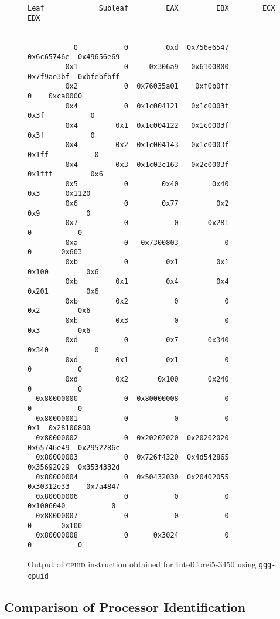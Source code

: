 \documentclass[a4paper,10pt,oneside,unicode]{article}
\newcommand{\cpuid}{\textsc{cpuid} }
\begin{document}
\begin{figure}[htbp]
\centering
\begin{verbatim}
Leaf             Subleaf         EAX         EBX        ECX          EDX
------------------------------------------------------------------------
           0           0         0xd  0x756e6547  0x6c65746e  0x49656e69
         0x1           0     0x306a9   0x6100800  0x7f9ae3bf  0xbfebfbff
         0x2           0  0x76035a01    0xf0b0ff           0    0xca0000
         0x4           0  0x1c004121   0x1c0003f        0x3f           0
         0x4         0x1  0x1c004122   0x1c0003f        0x3f           0
         0x4         0x2  0x1c004143   0x1c0003f       0x1ff           0
         0x4         0x3  0x1c03c163   0x2c0003f      0x1fff         0x6
         0x5           0        0x40        0x40         0x3      0x1120
         0x6           0        0x77         0x2         0x9           0
         0x7           0           0       0x281           0           0
         0xa           0   0x7300803           0           0       0x603
         0xb           0         0x1         0x1       0x100         0x6
         0xb         0x1         0x4         0x4       0x201         0x6
         0xb         0x2           0           0         0x2         0x6
         0xb         0x3           0           0         0x3         0x6
         0xd           0         0x7       0x340       0x340           0
         0xd         0x1         0x1           0           0           0
         0xd         0x2       0x100       0x240           0           0
  0x80000000           0  0x80000008           0           0           0
  0x80000001           0           0           0         0x1  0x28100800
  0x80000002           0  0x20202020  0x20202020  0x65746e49  0x2952286c
  0x80000003           0  0x726f4320  0x4d542865  0x35692029  0x3534332d
  0x80000004           0  0x50432030  0x20402055  0x30312e33    0x7a4847
  0x80000006           0           0           0   0x1006040           0
  0x80000007           0           0           0           0       0x100
  0x80000008           0      0x3024           0           0           0
\end{verbatim}

    \caption{Output of \cpuid instruction obtained for Intel\textregistered Core\texttrademark i5-3450 using \texttt{ggg-cpuid}~\cite{ggg-cpuid}}\label{fig:real-hw}
\end{figure}

\subsection{Comparison of Processor Identification}
\end{document}
